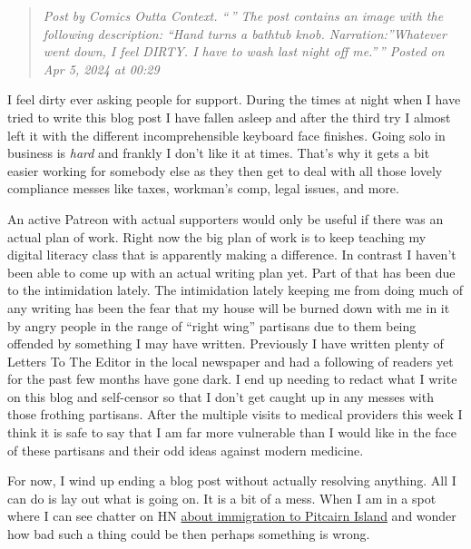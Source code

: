 \begin{quote}
\emph{Post by Comics Outta Context. ``\,'' The post contains an image
with the following description: ``Hand turns a bathtub knob.
Narration:''Whatever went down, I feel DIRTY. I have to wash last night
off me.''\,'' Posted on Apr 5, 2024 at 00:29}
\end{quote}

I feel dirty ever asking people for support. During the times at night
when I have tried to write this blog post I have fallen asleep and after
the third try I almost left it with the different incomprehensible
keyboard face finishes. Going solo in business is \emph{hard} and
frankly I don't like it at times. That's why it gets a bit easier
working for somebody else as they then get to deal with all those lovely
compliance messes like taxes, workman's comp, legal issues, and more.

An active Patreon with actual supporters would only be useful if there
was an actual plan of work. Right now the big plan of work is to keep
teaching my digital literacy class that is apparently making a
difference. In contrast I haven't been able to come up with an actual
writing plan yet. Part of that has been due to the intimidation lately.
The intimidation lately keeping me from doing much of any writing has
been the fear that my house will be burned down with me in it by angry
people in the range of ``right wing'' partisans due to them being
offended by something I may have written. Previously I have written
plenty of Letters To The Editor in the local newspaper and had a
following of readers yet for the past few months have gone dark. I end
up needing to redact what I write on this blog and self-censor so that I
don't get caught up in any messes with those frothing partisans. After
the multiple visits to medical providers this week I think it is safe to
say that I am far more vulnerable than I would like in the face of these
partisans and their odd ideas against modern medicine.

For now, I wind up ending a blog post without actually resolving
anything. All I can do is lay out what is going on. It is a bit of a
mess. When I am in a spot where I can see chatter on HN
\href{https://news.ycombinator.com/item?id=39923023}{about immigration
to Pitcairn Island} and wonder how bad such a thing could be then
perhaps something is wrong.
